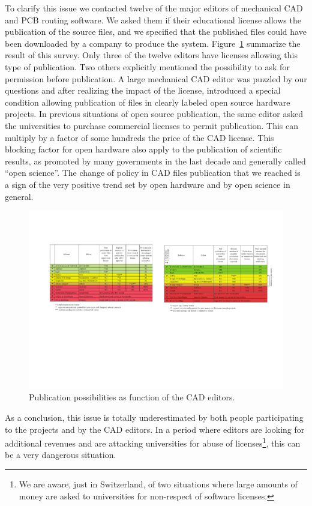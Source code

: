 \documentclass[letterpaper, 10 pt, conference]{ieeeconf}  %
\begin{document}
To clarify this issue we contacted twelve of the major editors of mechanical CAD and PCB routing software.
We asked them if their educational license allows the publication of the source files, and we specified that the published files could have been downloaded by a company to produce the system.
Figure~\ref{fig:editors} summarize the result of this survey.
Only three of the twelve editors have licenses allowing this type of publication. 
Two others explicitly mentioned the possibility to ask for permission before publication.
A large mechanical CAD editor was puzzled by our questions and after realizing the impact of the license, introduced a special condition allowing publication of files in clearly labeled open source hardware projects.
In previous situations of open source publication, the same editor asked the universities to purchase commercial licenses to permit publication.
This can multiply by a factor of some hundreds the price of the CAD license.
This blocking factor for open hardware also apply to the publication of scientific results, as promoted by many governments in the last decade and generally called ``open science''.
The change of policy in CAD files publication that we reached is a sign of the very positive trend set by open hardware and by open science in general.

\begin{figure}
\centering
\includegraphics[width=\columnwidth]{figures/table}
\caption{Publication possibilities as function of the CAD editors.}
\label{fig:editors}
\end{figure}

As a conclusion, this issue is totally underestimated by both people participating to the projects and by the CAD editors. 
In a period where editors are looking for additional revenues and are attacking universities for abuse of licenses\footnote{We are aware, just in Switzerland, of two situations where large amounts of money are asked to universities for non-respect of software licenses.}, this can be a very dangerous situation.
\end{document}
